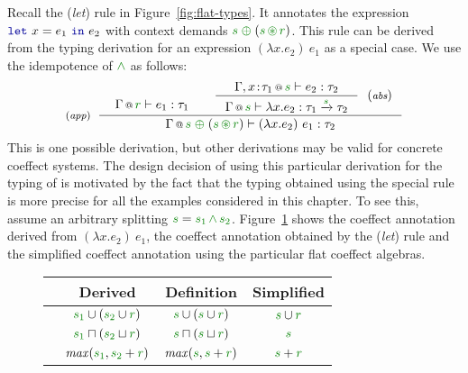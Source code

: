 Recall the (\emph{let}) rule in Figure~\ref{fig:flat-types}. It annotates the expression
$\kvd{let}~x=e_1~\kvd{in}~e_2$ with context demands $\cclrd{s}\;\cpar\;(\cclrd{s}\,\cseq\,\cclrd{r})$.
This rule can be derived from the typing derivation for an expression $(\lambda x.e_2)~e_1$ as
a special case. We use the idempotence of $\czip$ as follows:
%
\begin{equation*}
\tyrule{app}
  {\begin{array}{l}
   \vspace{-1.5em}
   \coctx{\Gamma}{\cclrd{r}} \vdash e_1 : \tau_1
   \end{array} &
   \tyruler{abs}
       { \coctx{\Gamma, x\!:\!\tau_1}{\cclrd{s}} \vdash e_2 : \tau_2 }
       { \coctx{\Gamma}{\cclrd{s}} \vdash \lambda x.e_2 : \tau_1 \xrightarrow{\cclrd{s}} \tau_2 } }
  { \coctx{\Gamma}{\cclrd{s}\;\cpar\;(\cclrd{s}\,\cseq\,\cclrd{r})} \vdash (\lambda x.e_2)~e_1 : \tau_2 }
\end{equation*}
%
This is one possible derivation, but other derivations may be valid for concrete coeffect systems.
The design decision of using this particular derivation for the typing of  is motivated by
the fact that the typing obtained using the special rule is more precise for all the examples
considered in this chapter. To see this, assume an arbitrary splitting
$\cclrd{s} = \cclrd{s_1}\,\czip\,\cclrd{s_2}$. Figure~\ref{fig:flat-simplelet}
shows the coeffect annotation derived from $(\lambda x.e_2)~e_1$, the coeffect annotation obtained
by the (\emph{let}) rule and the simplified coeffect annotation using the particular flat coeffect
algebras.

\begin{figure}
\begin{center}
\begin{tabular}{ | l | c | c | c |}
\hline
& \textbf{\footnotesize Derived \hspace{1em}} & \textbf{\footnotesize Definition\hspace{1em}} & \textbf{\footnotesize Simplified\hspace{1em}} \\ \hline
\hspace{-1em}{\footnotesize Implicit parameters} & $\cclrd{s_1} \cup (\cclrd{s_2} \cup \cclrd{r})$ & $\cclrd{s} \cup (\cclrd{s} \cup \cclrd{r})$ & $\cclrd{s} \cup \cclrd{r}$ \\ \hline
\hspace{-1em}{\footnotesize Liveness} & $\cclrd{s_1} \sqcap (\cclrd{s_2} \sqcup \cclrd{r})$ & $\cclrd{s} \sqcap (\cclrd{s} \sqcup \cclrd{r})$ & $\cclrd{s}$ \\ \hline
\hspace{-1em}{\footnotesize Dataflow} & $\mathit{max}(\cclrd{s_1}, \cclrd{s_2} + \cclrd{r})$ & $\mathit{max}(\cclrd{s}, \cclrd{s} + \cclrd{r})$ & $\cclrd{s} + \cclrd{r}$ \\ \hline
\end{tabular}
\end{center}

\vspace{-0.5em}
\label{fig:flat-simplelet}
\end{figure}

